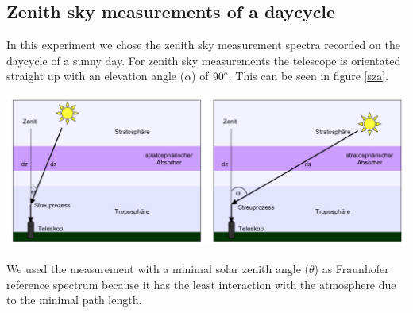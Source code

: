 \documentclass[12pt, english]{scrartcl} %
\newenvironment{Figure}
  {\par\medskip\noindent\minipage{\linewidth}}
  {\endminipage\par\medskip}
\begin{document}
\begin{multicols}{2}
\subsection{Zenith sky measurements of a daycycle}
In this experiment we chose the zenith sky measurement spectra recorded on the daycycle of a sunny day. For zenith sky measurements the telescope is orientated straight up with an elevation angle ($\alpha$) of $90 \degree $. This can be seen in figure \ref{sza}.\\
\begin{Figure}
 \centering
 \captionsetup{format=plain}
 \includegraphics[width=\linewidth]{graphics/sza.png}
 \label{sza}
\end{Figure}
We used the measurement with a minimal solar zenith angle ($\theta$) as Fraunhofer reference spectrum because it has the least interaction with the atmosphere due to the minimal path length. 

\end{multicols}
\end{document}
